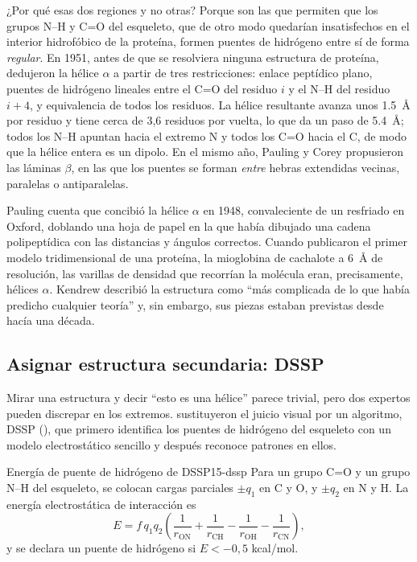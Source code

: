 ¿Por qué esas dos regiones y no otras? Porque son las que permiten que los grupos N--H y C=O del esqueleto, que de otro modo quedarían insatisfechos en el interior hidrofóbico de la proteína, formen puentes de hidrógeno entre sí de forma \emph{regular}. En 1951, antes de que se resolviera ninguna estructura de proteína, \textcite{c15-pauling1951} dedujeron la hélice $\alpha$ a partir de tres restricciones: enlace peptídico plano, puentes de hidrógeno lineales entre el C=O del residuo $i$ y el N--H del residuo $i+4$, y equivalencia de todos los residuos. La hélice resultante avanza unos \SI{1,5}{\angstrom} por residuo y tiene cerca de 3,6 residuos por vuelta, lo que da un paso de \SI{5,4}{\angstrom}; todos los N--H apuntan hacia el extremo N y todos los C=O hacia el C, de modo que la hélice entera es un dipolo. En el mismo año, Pauling y Corey propusieron las láminas $\beta$, en las que los puentes se forman \emph{entre} hebras extendidas vecinas, paralelas o antiparalelas.

\begin{historia}
Pauling cuenta que concibió la hélice $\alpha$ en 1948, convaleciente de un resfriado en Oxford, doblando una hoja de papel en la que había dibujado una cadena polipeptídica con las distancias y ángulos correctos. Cuando \textcite{c15-kendrew1958} publicaron el primer modelo tridimensional de una proteína, la mioglobina de cachalote a \SI{6}{\angstrom} de resolución, las varillas de densidad que recorrían la molécula eran, precisamente, hélices $\alpha$. Kendrew describió la estructura como ``más complicada de lo que había predicho cualquier teoría'' y, sin embargo, sus piezas estaban previstas desde hacía una década.
\end{historia}

\subsection{Asignar estructura secundaria: DSSP}

Mirar una estructura y decir ``esto es una hélice'' parece trivial, pero dos expertos pueden discrepar en los extremos. \textcite{c15-kabsch1983} sustituyeron el juicio visual por un algoritmo, DSSP (), que primero identifica los puentes de hidrógeno del esqueleto con un modelo electrostático sencillo y después reconoce patrones en ellos.

\begin{definicion}{Energía de puente de hidrógeno de DSSP}{15-dssp}
Para un grupo C=O y un grupo N--H del esqueleto, se colocan cargas parciales $\pm q_1$ en C y O, y $\pm q_2$ en N y H. La energía electrostática de interacción es
\begin{equation}\label{eq:15-dssp}
E = f\,q_1 q_2\left(\frac{1}{r_{\mathrm{ON}}}+\frac{1}{r_{\mathrm{CH}}}-\frac{1}{r_{\mathrm{OH}}}-\frac{1}{r_{\mathrm{CN}}}\right),
\end{equation}
y se declara un puente de hidrógeno si $E<-0{,}5$ kcal/mol.
\end{definicion}

